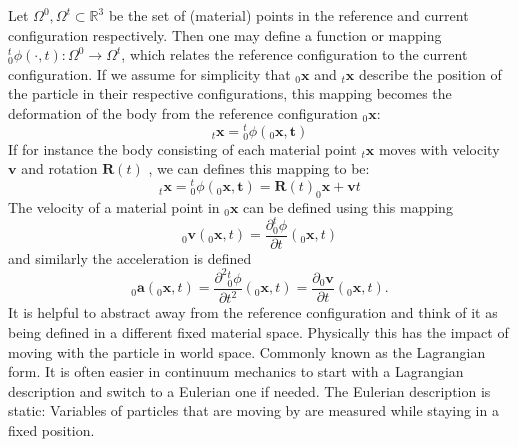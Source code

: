 \documentclass[m,times]{cgMA}
\begin{document}
Let $\Omega ^ { 0 } , \Omega ^ { t } \subset \mathbb { R } ^ {  { 3 } }$ be the set of (material) points in the reference and current configuration respectively.  Then one may define a function or mapping ${^t_0}\phi ( \cdot , t ) : \Omega ^ { 0 } \rightarrow \Omega ^ { t }$, which relates the reference configuration to the current configuration. If we assume for simplicity that $_0\boldsymbol{x}$ and $_t\boldsymbol{{x}}$ describe the position of the particle in their respective configurations, this mapping becomes the deformation of the body from the reference configuration $_0\boldsymbol{x}$:
\begin{equation}
  _t\boldsymbol{x} =  {^t_0}\phi ( _0\boldsymbol{x} , \boldsymbol { t } )
\end{equation}
If for instance the body consisting of each material point $_t\boldsymbol{x}$ moves with velocity $\boldsymbol{v}$ and rotation $\boldsymbol{R}(t)$ , we can defines this mapping to be:
\begin{equation}\label{eq:rigid}
  _t\boldsymbol{{x}} = {^t_0}\phi ( _0\boldsymbol{x} , \boldsymbol { t } ) = \boldsymbol{R}(t)_0\boldsymbol{x}+\boldsymbol{v}t
\end{equation}
The velocity of a material point in $_0\boldsymbol{x}$ can be defined using this mapping
\begin{equation}\label{eq:velocity}
  _0\boldsymbol{v}(_0\boldsymbol{x},t) = \frac{\partial {^t_0}\phi}{\partial t}(_0\boldsymbol{x},t)
\end{equation}
and similarly the acceleration is defined
\begin{equation}
  _0\boldsymbol{a}(_0\boldsymbol{x},t) = \frac{\partial^2 {^t_0}\phi}{\partial t^2}(_0\boldsymbol{x},t) = \frac{\partial _0\boldsymbol{v}}{\partial t}(_0\boldsymbol{x},t).
\end{equation}
It is helpful to abstract away from the reference configuration and think of it as being defined in a different fixed material space. Physically this has the impact of moving with the particle in world space. Commonly known as the Lagrangian form. It is often easier in continuum mechanics to start with a Lagrangian description and switch to a Eulerian one if needed. The Eulerian description is static: Variables of particles that are moving by are measured while staying in a fixed position.
\end{document}

